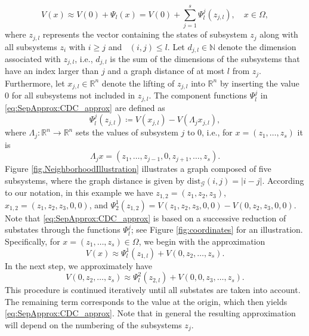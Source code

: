 \documentclass{article}
\def\N{\mathbb{N}}
\newcommand{\R}{\mathbb{R}}
\newcommand{\Rn}{\R^n}
\DeclareMathOperator{\distG}{\operatorname{dist_\mathcal{G}}} %
\begin{document}
\begin{equation} \label{eq:SepApprox:CDC_approx}
    V(x) \approx V(0) + \Psi_l(x) =  V(0) + \sum_{j = 1}^s \Psi_l^j(z_{j,l}), \quad x \in \Omega, 
\end{equation}
where $z_{j,l}$ represents the vector containing the states of subsystem $z_j$ along with all subsystems $z_i$ with $i \geq j$ and $\distG(i,j) \leq l$. Let $d_{j,l} \in \N$ denote the dimension associated with $z_{j,l}$, i.e., $d_{j,l}$ is the sum of the dimensions of the subsystems that have an index larger than $j$ and a graph distance of at most $l$ from $z_j$. Furthermore, let $x_{j,l} \in \Rn$ denote the lifting of $z_{j,l}$ into $\Rn$ by inserting the value $0$ for all subsystems not included in $z_{j,l}$. The component functions $\Psi_l^j$ in \eqref{eq:SepApprox:CDC_approx} are defined as
\begin{equation} \label{eq:SepApprox:DefPsij}
    \Psi_l^j(z_{j,l}) \coloneqq V(x_{j,l}) - V(\Lambda_j x_{j,l}), 
\end{equation}
where $\Lambda_j \colon \Rn \to \Rn$ sets the values of subsystem $j$ to $0$, i.e., for $x = (z_1, \dots, z_s)$ it is 
\begin{equation*}
    \Lambda_j x = (z_1, \dots, z_{j-1}, 0, z_{j+1}, \dots, z_s). 
\end{equation*} 
Figure \ref{fig.NeighborhoodIllustration} illustrates a graph composed of five subsystems, where the graph distance is given by $\text{dist}_\mathcal{G}(i,j) = |i - j|$. According to our notation, in this example we have $z_{1,2} = (z_1, z_2, z_3)$, $x_{1,2} = (z_1, z_2, z_3, 0, 0)$, and $\Psi_2^1(z_{1,2}) = V(z_1, z_2, z_3, 0, 0) - V(0, z_2, z_3, 0, 0)$.
Note that \eqref{eq:SepApprox:CDC_approx} is based on a successive reduction of substates through the functions $\Psi_l^j$; see Figure \ref{fig:coordinates} for an illustration. Specifically, for $x = (z_1, \dots, z_s) \in \Omega$, we begin with the approximation
\[
V(x) \approx \Psi_l^1(z_{1,l}) + V(0, z_2, \dots, z_s).
\]
In the next step, we approximately have
\[
V(0, z_2, \dots, z_s) \approx \Psi_l^2(z_{2,l}) + V(0, 0, z_3, \dots, z_s).
\]
This procedure is continued iteratively until all substates are taken into account. The remaining term corresponds to the value at the origin, which then yields \eqref{eq:SepApprox:CDC_approx}. Note that in general the resulting approximation will depend on the numbering of the subsystems $z_j$.
 
\end{document}
